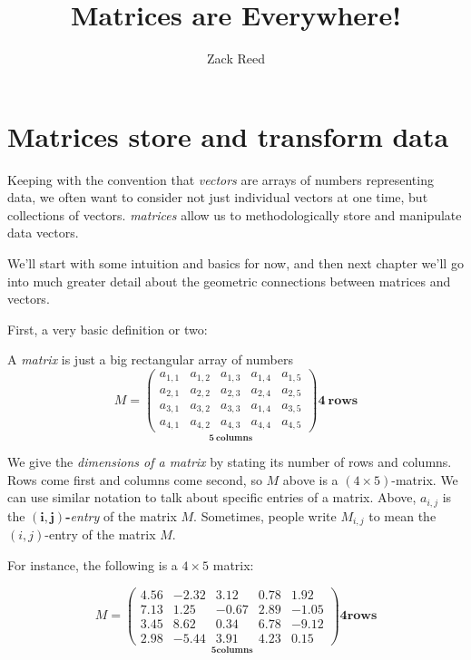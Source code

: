 \documentclass{ximera}
\author{Zack Reed} %
\title{Matrices are Everywhere!}
\begin{document}
\begin{abstract}

\end{abstract}
\maketitle


\section{Matrices store and transform data}

Keeping with the convention that \emph{vectors} are arrays of numbers representing data, we often want to consider not just individual vectors at one time, but collections of vectors. \emph{matrices} allow us to methodologically store and manipulate data vectors.

We'll start with some intuition and basics for now, and then next chapter we'll go into much greater detail about the geometric connections between matrices and vectors.

First, a very basic definition or two:

\begin{definition}

A \emph{matrix} is just a big rectangular array of numbers
\[
M =
\underset{\displaystyle\boldsymbol{5}~\textbf{columns}}{\begin{pmatrix}
  a_{1,1} & a_{1,2} & a_{1,3} & a_{1,4} & a_{1,5} \\
  a_{2,1} & a_{2,2} & a_{2,3} & a_{2,4} & a_{2,5} \\
  a_{3,1} & a_{3,2} & a_{3,3} & a_{1,4} & a_{3,5} \\
  a_{4,1} & a_{4,2} & a_{4,3} & a_{4,4} & a_{4,5}
\end{pmatrix}}
\boldsymbol{4}~\textbf {rows}
\]

We give the \emph{dimensions of a matrix} by stating its number of rows
and columns. Rows come first and columns come second, so $M$ above is
a $(4\times 5)$-matrix. We can use similar notation to talk about
specific entries of a matrix. Above, $a_{i,j}$ is the
$\boldsymbol{(i,j)}${\bf-}\emph{entry} of the matrix $M$. Sometimes,
people write $M_{i,j}$ to mean the $(i,j)$-entry of the matrix $M$.

\end{definition}

For instance, the following is a $4\times 5$ matrix:

\[
M =
\underset{\displaystyle\boldsymbol{5}\textbf{columns}}{
\begin{pmatrix}
4.56 & -2.32 & 3.12 & 0.78 & 1.92 \\
7.13 & 1.25 & -0.67 & 2.89 & -1.05 \\
3.45 & 8.62 & 0.34 & 6.78 & -9.12 \\
2.98 & -5.44 & 3.91 & 4.23 & 0.15
\end{pmatrix}}
\boldsymbol{4}\textbf{rows}
\]
\end{document}
